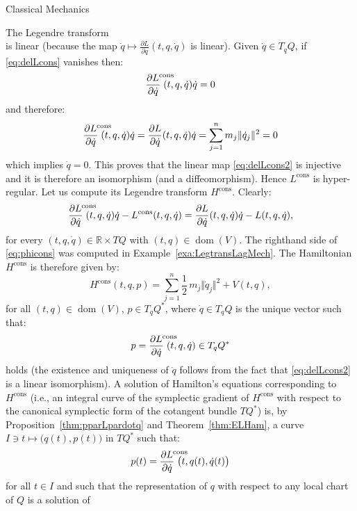 \documentclass[oneside,a4paper,11pt]{amsbook}
\newcommand{\R}{\mathds R}
\DeclareMathOperator{\Dom}{dom}
\theoremstyle{remark}\newtheorem{exercise}{Exercise}[chapter]
\theoremstyle{plain}\newtheorem{teo}{Theorem}[section]
\theoremstyle{plain}\newtheorem{lem}[teo]{Lemma}
\theoremstyle{plain}\newtheorem{prop}[teo]{Proposition}
\theoremstyle{plain}\newtheorem{cor}[teo]{Corollary}
\theoremstyle{definition}\newtheorem{defin}[teo]{Definition}
\theoremstyle{remark}\newtheorem{rem}[teo]{Remark}
\theoremstyle{definition}\newtheorem{notation}[teo]{Notation}
\theoremstyle{definition}\newtheorem{convention}[teo]{Convention}
\theoremstyle{definition}\newtheorem{example}[teo]{Example}
\numberwithin{section}{chapter}
\numberwithin{equation}{section}
\begin{document}
\begin{chapter}{Classical Mechanics}
\begin{section}{The Legendre transform}
\begin{equation}
\end{equation}
is linear (because the map $\dot q\mapsto\frac{\partial L}{\partial\dot q}(t,q,\dot q)$ is linear).
Given $\dot q\in T_qQ$, if \eqref{eq:delLcons} vanishes then:
\[\frac{\partial L^{\hbox to 0pt{$\scriptstyle\mathrm{cons}$\hskip 0pt minus 1fil}}}{\partial\dot q}\;
(t,q,\dot q)\dot q=0\]
and therefore:
\[\frac{\partial L^{\hbox to 0pt{$\scriptstyle\mathrm{cons}$\hskip 0pt minus 1fil}}}{\partial\dot q}\;
(t,q,\dot q)\dot q=\frac{\partial L}{\partial\dot q}(t,q,\dot q)\dot q=\sum_{j=1}^nm_j\Vert\dot q_j\Vert^2=0\]
which implies $\dot q=0$. This proves that the linear map \eqref{eq:delLcons2} is injective and it is therefore
an isomorphism (and a diffeomorphism). Hence $L^{\mathrm{cons}}$ is hyper-regular. Let us compute its Legendre transform
$H^{\mathrm{cons}}$. Clearly:
\begin{equation}\label{eq:phicons}
\frac{\partial L^{\hbox to 0pt{$\scriptstyle\mathrm{cons}$\hskip 0pt minus 1fil}}}{\partial\dot q}\;
(t,q,\dot q)\dot q-L^{\mathrm{cons}}(t,q,\dot q)=\frac{\partial L}{\partial\dot q}(t,q,\dot q)\dot q-L(t,q,\dot q),
\end{equation}
for every $(t,q,\dot q)\in\R\times TQ$ with $(t,q)\in\Dom(V)$. The righthand side of \eqref{eq:phicons} was
computed in Example~\ref{exa:LegtransLagMech}. The Hamiltonian $H^{\mathrm{cons}}$ is therefore given by:
\[H^{\mathrm{cons}}(t,q,p)=\sum_{j=1}^n\frac12\,m_j\Vert\dot q_j\Vert^2+V(t,q),\]
for all $(t,q)\in\Dom(V)$, $p\in T_qQ^*$, where $\dot q\in T_qQ$ is the unique vector such that:
\begin{equation}\label{eq:defpcons}
p=\frac{\partial L^{\hbox to 0pt{$\scriptstyle\mathrm{cons}$\hskip 0pt minus 1fil}}}{\partial\dot q}\;
(t,q,\dot q)\in T_qQ^*
\end{equation}
holds (the existence and uniqueness of $\dot q$ follows from the fact that \eqref{eq:delLcons2} is a linear
isomorphism). A solution of Hamilton's equations corresponding to $H^{\mathrm{cons}}$ (i.e., an integral
curve of the symplectic gradient of $H^{\mathrm{cons}}$ with respect to the canonical symplectic
form of the cotangent bundle $TQ^*$) is, by Proposition~\ref{thm:pparLpardotq} and Theorem~\ref{thm:ELHam},
a curve $I\ni t\mapsto\big(q(t),p(t)\big)$ in $TQ^*$ such that:
\begin{equation}\label{eq:ptHcons}
p(t)=\frac{\partial L^{\hbox to 0pt{$\scriptstyle\mathrm{cons}$\hskip 0pt minus 1fil}}}{\partial\dot q}\;
\big(t,q(t),\dot q(t)\big)
\end{equation}
for all $t\in I$ and such that the representation of $q$ with respect to any local chart of $Q$ is a solution of

\end{section}
\end{chapter}
\end{document}
